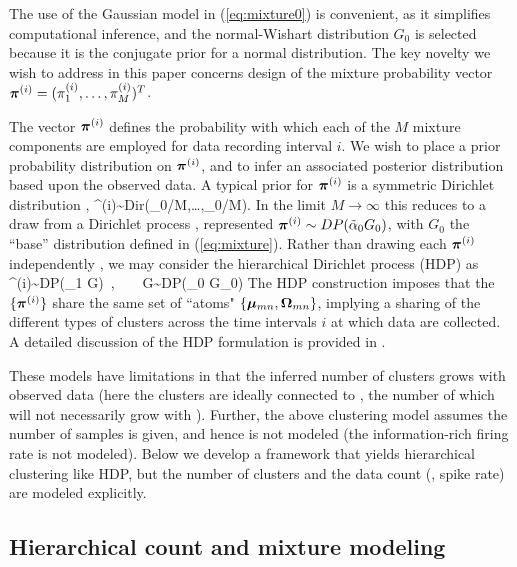 \documentclass[journal]{IEEEtran}
\begin{document}
The use of the Gaussian model in (\ref{eq:mixture0}) is convenient, as it simplifies computational inference, and the normal-Wishart distribution $G_0$ is selected because it is the conjugate prior for a normal distribution. The key novelty we wish to address in this paper concerns design of the mixture probability vector $\boldsymbol{\pi}^{(i)}=(\pi_1^{(i)},\dots,\pi_{M}^{(i)})^T$.

The vector $\boldsymbol{\pi}^{(i)}$ defines the probability with which each of the $M$ mixture components are employed for data recording interval $i$. We wish to place a prior probability distribution on $\boldsymbol{\pi}^{(i)}$, and to infer an associated posterior distribution based upon the observed data.
A typical prior for $\boldsymbol{\pi}^{(i)}$ is a symmetric Dirichlet distribution \cite{Dilan},
\beq \piv^{(i)}\sim\mbox{Dir}(\tilde{\alpha}_0/M,\dots,\tilde{\alpha}_0/M).\label{eq:Dir}\eeq
In the limit\add{,} $M\rightarrow\infty$\add{,} this reduces to a draw from a Dirichlet process \cite{Wood2009,Bo2011}, represented $\boldsymbol{\pi}^{(i)}\sim\relax{DP}(\tilde{\alpha}_0 G_0)$, with $G_0$ the ``base'' distribution defined in (\ref{eq:mixture}). Rather than drawing each $\boldsymbol{\pi}^{(i)}$ independently , we may consider the hierarchical Dirichlet process (HDP) \cite{HDP} as
\beq \piv^{(i)}\sim\mbox{DP}(\tilde{\alpha}_1 G)~,~~~~G\sim\mbox{DP}(\tilde{\alpha}_0 G_0)\eeq
The HDP construction imposes that the $\{\boldsymbol{\pi}^{(i)}\}$ share the same set of ``atoms" $\{\boldsymbol{\mu}_{mn},\boldsymbol{\Omega}_{mn}\}$, implying
a sharing of the different types of clusters across the time intervals $i$ at which data are collected. A detailed discussion of the HDP formulation is provided in \cite{Bo2011}.

These models have limitations in that the inferred number of clusters grows with observed data (here the clusters are ideally connected to , the number of which will not necessarily grow with  ). Further, the above clustering model assumes the number of samples is given, and hence is not modeled (the information-rich firing rate is not modeled).
Below we develop a framework that yields hierarchical clustering like HDP, but the number of clusters and the data count (, spike rate) are modeled explicitly.

\subsection{Hierarchical count and mixture modeling\label{sec:focused}}
\end{document}
